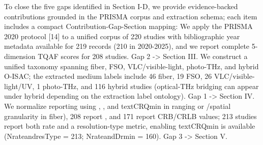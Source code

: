 {}
\markdownRendererSectionEnd \markdownRendererSectionBegin
{}\markdownRendererInterblockSeparator
{}To close the five gaps identified in Section I-D, we provide evidence-backed contributions grounded in the PRISMA corpus and extraction schema; each item includes a compact Contribution-Gap-Section mapping:\markdownRendererInterblockSeparator
{}\markdownRendererOlBegin
{} We apply the PRISMA 2020 protocol [14] to a unified corpus of 220 studies with bibliographic year metadata available for 219 records (210 in 2020-2025), and we report complete 5-dimension TQAF scores for 208 studies.  Gap 2 -> Section III.\markdownRendererOlItemEnd 
{} We construct a unified taxonomy spanning fiber, FSO, VLC/visible-light, photo-THz, and hybrid O-ISAC; the extracted medium labels include 46 fiber, 19 FSO, 26 VLC/visible-light/UV, 1 photo-THz, and 116 hybrid studies (optical-THz bridging can appear under hybrid depending on the extraction label ontology).  Gap 1 -> Section IV.\markdownRendererOlItemEnd 
{} We normalize reporting using , , and \markdownRendererDollarSign{}\markdownRendererBackslash{}text\markdownRendererLeftBrace{}CRQ\markdownRendererRightBrace{}\markdownRendererLeftBrace{}\markdownRendererBackslash{}min\markdownRendererRightBrace{}\markdownRendererDollarSign{} in ranging or /spatial granularity in fiber), 208 report , and 171 report CRB/CRLB values; 213 studies report both rate and a resolution-type metric, enabling \markdownRendererDollarSign{}\markdownRendererBackslash{}text\markdownRendererLeftBrace{}CRQ\markdownRendererRightBrace{}\markdownRendererLeftBrace{}\markdownRendererBackslash{}min\markdownRendererRightBrace{}\markdownRendererDollarSign{} is available (N\markdownRendererUnderscore{}rate\markdownRendererUnderscore{}and\markdownRendererUnderscore{}resType = 213; N\markdownRendererUnderscore{}rate\markdownRendererUnderscore{}and\markdownRendererUnderscore{}Drmin = 160).  Gap 3 -> Section V.\markdownRendererOlItemEnd 
